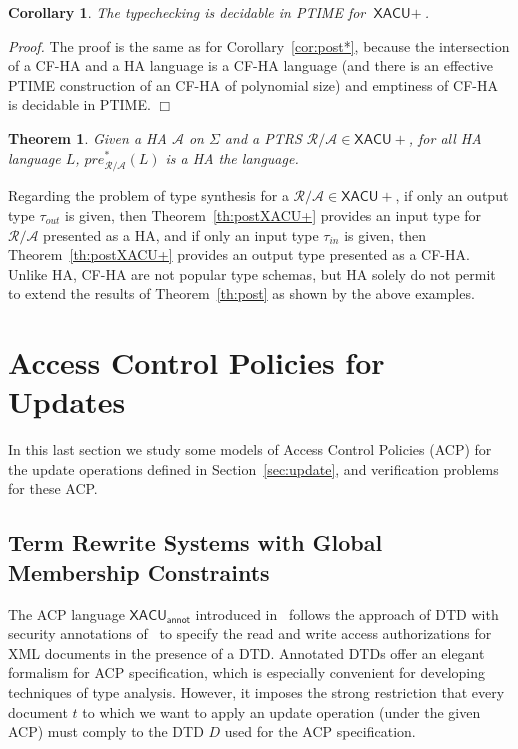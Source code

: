 \documentclass[a4paper]{article}
\theoremstyle{plain}
\newtheorem{theorem}{Theorem}
\newtheorem{corollary}{Corollary}{\bfseries}{\itshape}
\newcommand{\qed}{\hfill $\Box$}
\newenvironment{proof}{\noindent\emph{Proof.}}{}
\newcommand{\R}{\mathcal{R}}
\newcommand{\A}{\mathcal{A}}
\newcommand{\ptrs}[2]{{#1}{/}{#2}}
\newcommand{\pre}{\mathit{pre}}
\newcommand{\XACU}{\textsf{XACU}}
\begin{document}
\begin{corollary}
The typechecking is decidable in PTIME for $\XACU+$.
\end{corollary}
\begin{proof}
The proof is the same as for Corollary~\ref{cor:post*},
because the intersection of a CF-HA and a HA language
is a CF-HA language 
(and there is an effective PTIME construction of an CF-HA of polynomial size)
and emptiness of CF-HA is decidable in PTIME.
\qed
\end{proof}





\label{sec:pre*}
\begin{theorem} \label{th:pre}
Given a HA $\A$ on $\Sigma$ and a PTRS $\ptrs{\R}{\A} \in \XACU+$,
for all HA language $L$, $\pre_{\ptrs{\R}{\A}}^*(L)$
is a HA the language.
\end{theorem}


Regarding the problem of type synthesis
for a $\ptrs{\R}{\A} \in \XACU+$,
if only an output type $\tau_{\mathit{out}}$ is given, 
then Theorem~\ref{th:postXACU+} provides an input type 
for $\ptrs{\R}{\A}$ presented as a HA, 
and if only an input type $\tau_{\mathit{in}}$ is given, 
then Theorem~\ref{th:postXACU+}
provides an output type presented as a CF-HA.
Unlike HA, CF-HA are not popular type schemas,
but HA solely do not permit to extend the results 
of Theorem~\ref{th:post} as shown by the above examples.





\section{Access Control Policies for Updates}
\label{sec:acp}
In this last section we study some models of Access Control Policies (ACP)
for the update operations defined in Section~\ref{sec:update},
and verification problems for these ACP.


\subsection{Term Rewrite Systems with Global Membership Constraints}
The ACP language $\XACU_\mathsf{annot}$ introduced in~\cite{FundulakiManeth07}
follows the approach of DTD with security annotations of~\cite{FanChan04}
to specify the read and write access authorizations for XML documents
in the presence of a DTD.
Annotated DTDs offer an elegant formalism for ACP specification,
which is especially convenient for developing techniques of type analysis.
However, it imposes the strong restriction that every document $t$ 
to which we want to apply an update operation (under the given ACP)
must comply to the DTD $D$ used for the ACP specification.
\end{document}
